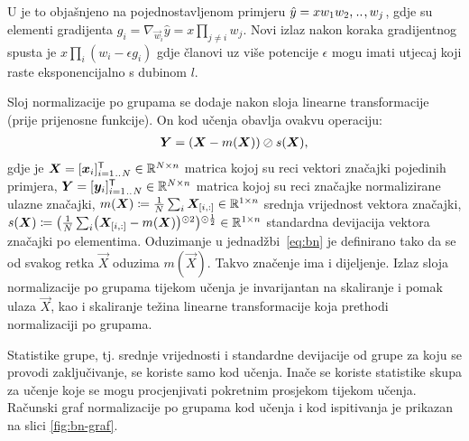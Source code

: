 \documentclass[utf8, diplomski, lmodern]{fer}
\begin{document}
U \cite{Goodfellow:2016:DL} je to objašnjeno na pojednostavljenom primjeru $\hat y=xw_1w_2,\bidot,w_j$, gdje su elementi gradijenta $g_i=\nabla_{\vec w_i}\hat y=x\prod_{j\neq i}w_j$. Novi izlaz nakon koraka gradijentnog spusta je $x\prod_i(w_i-\epsilon g_i)$ gdje članovi uz više potencije $\epsilon$ mogu imati utjecaj koji raste eksponencijalno s dubinom $l$.

Sloj normalizacije po grupama se dodaje nakon sloja linearne transformacije (prije prijenosne funkcije). On kod učenja obavlja ovakvu operaciju:
\begin{align} \label{eq:bn}
	\vec Y = \del{\vec X-m(\vec X)}\oslash s(\vec X) \text{,}
\end{align}
gdje je $\vec X=\sbr{\vec x_i}_{i=1\bidot N}^\tp\in\R^{N\times n}$ matrica kojoj su reci vektori značajki pojedinih primjera, $\vec Y=\sbr{\vec y_i}_{i=1\bidot N}^\tp\in\R^{N\times n}$ matrica kojoj su reci značajke normalizirane ulazne značajki, $m(\vec X)\coloneqq\frac{1}{N}\sum_i\vec X_\ind{i,:}\in\R^{1\times n}$ srednja vrijednost vektora značajki, $s(\vec X)\coloneqq\del{\frac{1}{N}\sum_i\del{\vec X_\ind{i,:}-m(\vec X)}^{\odot 2}}^{\odot\frac{1}{2}}\in\R^{1\times n}$ standardna devijacija vektora značajki po elementima. Oduzimanje u jednadžbi~\eqref{eq:bn} je definirano tako da se od svakog retka $\vec X$ oduzima $m(\vec X)$. Takvo značenje ima i dijeljenje. Izlaz sloja normalizacije po grupama tijekom učenja je invarijantan na skaliranje i pomak ulaza $\vec X$, kao i skaliranje težina linearne transformacije koja prethodi normalizaciji po grupama.

Statistike grupe, tj. srednje vrijednosti i standardne devijacije od grupe za koju se provodi zaključivanje, se koriste samo kod učenja. Inače se koriste statistike skupa za učenje koje se mogu procjenjivati pokretnim prosjekom tijekom učenja. Računski graf normalizacije po grupama kod učenja i kod ispitivanja je prikazan na slici \ref{fig:bn-graf}.
\end{document}
